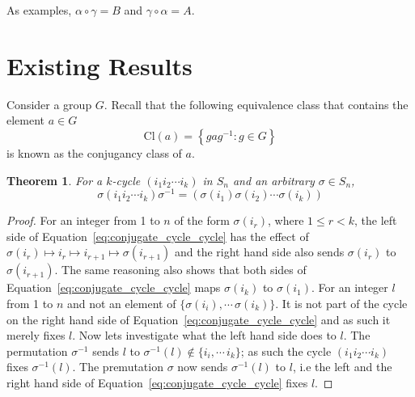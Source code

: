 \documentclass[a4paper,10pt]{article}
\newtheorem{theorem}{Theorem}[section]
\theoremstyle{definition}
\begin{document}
As examples, $\alpha \circ \gamma = B$ and $\gamma\circ \alpha = A$.  

\section{Existing Results}
Consider a group $G$. Recall that the following equivalence class that contains the element $a\in G$
\begin{equation}
 \textrm{Cl} (a)=\left\{gag^{-1}:g\in G\right\}
\end{equation}
is known as the conjugancy class of $a$. 

\begin{theorem} 
For a $k$-cycle $(i_1 i_2 \cdots i_k)$ in $S_n$ and an arbitrary $\sigma \in S_n$,
\begin{equation}
\label{eq:conjugate_cycle_cycle}
\sigma(i_1 i_2 \cdots i_k)\sigma^{-1} = (\sigma(i_1) \sigma(i_2)\cdots \sigma(i_k)) 
\end{equation}
\end{theorem}
\begin{proof}
For an integer from 1 to $n$ of the form $\sigma(i_r)$, where $1 \leq r < k$, the left side of Equation~\ref{eq:conjugate_cycle_cycle} has the effect of $\sigma(i_r) \mapsto i_r \mapsto i_{r+1} \mapsto \sigma(i_{r+1})$ and the right hand side also sends $\sigma(i_r)$ to $\sigma(i_{r+1})$. The same reasoning also shows that both sides of Equation~\ref{eq:conjugate_cycle_cycle} maps $\sigma(i_k)$ to $\sigma(i_{1})$. For an integer $l$ from 1 to $n$ and not an element of $\{\sigma(i_i),\cdots\,\sigma(i_k)\}$. It is not part of the cycle on the right hand side of Equation~\ref{eq:conjugate_cycle_cycle} and as such it merely fixes $l$. Now lets investigate what the left hand side does to $l$. The permutation $\sigma^{-1}$ sends $l$ to $\sigma^{-1}(l) \notin \{i_i,\cdots\,i_k\}$; as such the cycle $(i_1 i_2 \cdots i_k)$ fixes $\sigma^{-1}(l)$. The premutation $\sigma$ now sends $\sigma^{-1}(l)$ to $l$, i.e the left and the right hand side of Equation~\ref{eq:conjugate_cycle_cycle} fixes $l$.         
\end{proof}
\end{document}
